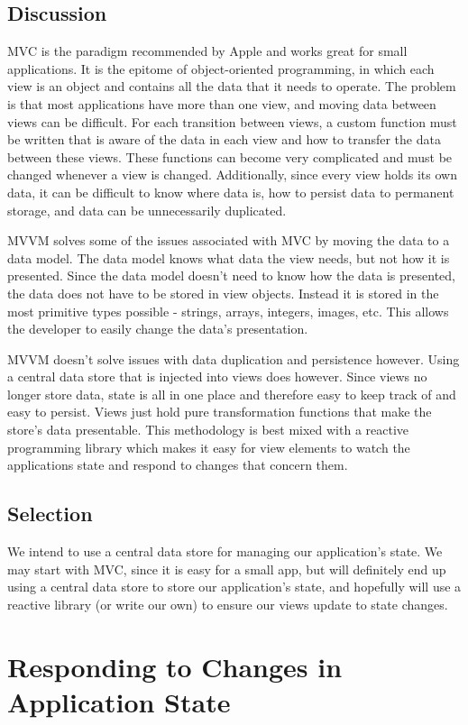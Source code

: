 \documentclass[letterpaper,10pt,titlepage]{article}
\begin{document}
\subsection{Discussion}
MVC is the paradigm recommended by Apple and works great for small applications. It is the epitome of object-oriented programming, in which each view is an object and contains all the data that it needs to operate. The problem is that most applications have more than one view, and moving data between views can be difficult. For each transition between views, a custom function must be written that is aware of the data in each view and how to transfer the data between these views. These functions can become very complicated and must be changed whenever a view is changed. Additionally, since every view holds its own data, it can be difficult to know where data is, how to persist data to permanent storage, and data can be unnecessarily duplicated.

MVVM solves some of the issues associated with MVC by moving the data to a data model. The data model knows what data the view needs, but not how it is presented. Since the data model doesn't need to know how the data is presented, the data does not have to be stored in view objects. Instead it is stored in the most primitive types possible - strings, arrays, integers, images, etc. This allows the developer to easily change the data's presentation.

MVVM doesn't solve issues with data duplication and persistence however. Using a central data store that is injected into views does however. Since views no longer store data, state is all in one place and therefore easy to keep track of and easy to persist. Views just hold pure transformation functions that make the store's data presentable. This methodology is best mixed with a reactive programming library which makes it easy for view elements to watch the applications state and respond to changes that concern them.

\subsection{Selection}
We intend to use a central data store for managing our application's state. We may start with MVC, since it is easy for a small app, but will definitely end up using a central data store to store our application's state, and hopefully will use a reactive library (or write our own) to ensure our views update to state changes.

\section{Responding to Changes in Application State}
\end{document}
